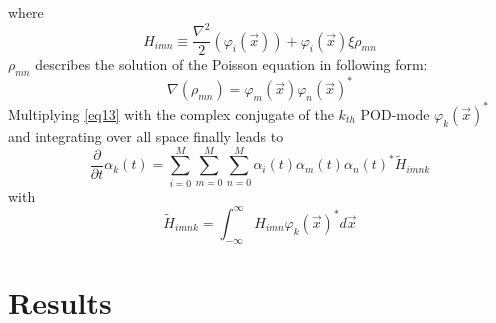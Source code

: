 \documentclass[usenatbib]{mn2e}
\begin{document}
where
\begin{equation}\label{eq14}
H_{imn} \equiv \dfrac {\nabla ^{2}} {2}(\varphi_i(\overrightarrow{x}))+\varphi_i(\overrightarrow{x}) \xi \rho_{mn}
\end{equation}  
\(\rho_{mn}\) describes the solution of the Poisson equation in following form: 
\begin{equation}\label{eq15}
\nabla(\rho_{mn}) = \varphi_m(\overrightarrow{x}) \varphi_n(\overrightarrow{x})^*
\end{equation}
Multiplying \ref{eq13} with the complex conjugate of the \(k_{th}\) POD-mode \(\varphi_{k}(\overrightarrow{x})^*\) and integrating over all space finally leads to
\begin{equation}\label{eq16}
\dfrac {\partial } {\partial t} \alpha_k(t) = \sum_{i=0}^M \sum_{m=0}^M \sum_{n=0}^M \alpha_i(t) \alpha_m(t) \alpha_n(t)^* \widetilde{H}_{imnk}
\end{equation}
with
\begin{equation}\label{eq17}
\widetilde{H}_{imnk} = \int_{-\infty}^{\infty}H_{imn} \varphi_k(\overrightarrow{x})^* d\overrightarrow{x}
\end{equation}

\section{Results}



\def\aap{A\&A}
\def\araa{ARA\&A}
\def\apjl{APJL}
\def\mnras{MNRAS}
\def\nat{Nature}
\def\prd{Phys Rev D}


\end{document}
